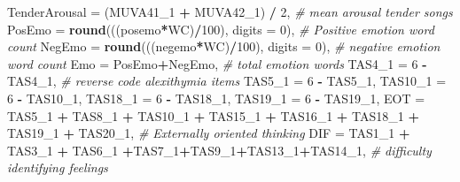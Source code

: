 \documentclass[]{article}
\newenvironment{Shaded}{\begin{snugshade}}{\end{snugshade}}
\newcommand{\CommentTok}[1]{\textcolor[rgb]{0.56,0.35,0.01}{\textit{#1}}}
\newcommand{\DataTypeTok}[1]{\textcolor[rgb]{0.13,0.29,0.53}{#1}}
\newcommand{\DecValTok}[1]{\textcolor[rgb]{0.00,0.00,0.81}{#1}}
\newcommand{\KeywordTok}[1]{\textcolor[rgb]{0.13,0.29,0.53}{\textbf{#1}}}
\newcommand{\NormalTok}[1]{#1}
\newcommand{\OperatorTok}[1]{\textcolor[rgb]{0.81,0.36,0.00}{\textbf{#1}}}
\newcommand{\StringTok}[1]{\textcolor[rgb]{0.31,0.60,0.02}{#1}}
\begin{document}
\begin{Shaded}
\begin{Highlighting}[]
{                          \DataTypeTok{TenderArousal =}\NormalTok{ (MUVA41_}\DecValTok{1} \OperatorTok{+}\StringTok{ }\NormalTok{MUVA42_}\DecValTok{1}\NormalTok{) }\OperatorTok{/}\StringTok{ }\DecValTok{2}\NormalTok{, }\CommentTok{# mean arousal tender songs}
                          \DataTypeTok{PosEmo =} \KeywordTok{round}\NormalTok{(((posemo}\OperatorTok{*}\NormalTok{WC)}\OperatorTok{/}\DecValTok{100}\NormalTok{), }\DataTypeTok{digits =} \DecValTok{0}\NormalTok{), }\CommentTok{# Positive emotion word count}
                          \DataTypeTok{NegEmo =} \KeywordTok{round}\NormalTok{(((negemo}\OperatorTok{*}\NormalTok{WC)}\OperatorTok{/}\DecValTok{100}\NormalTok{), }\DataTypeTok{digits =} \DecValTok{0}\NormalTok{), }\CommentTok{# negative emotion word count}
                          \DataTypeTok{Emo =}\NormalTok{ PosEmo}\OperatorTok{+}\NormalTok{NegEmo, }\CommentTok{# total emotion words}
                          \DataTypeTok{TAS4_1 =} \DecValTok{6} \OperatorTok{-}\StringTok{ }\NormalTok{TAS4_}\DecValTok{1}\NormalTok{, }\CommentTok{# reverse code alexithymia items}
                          \DataTypeTok{TAS5_1 =} \DecValTok{6} \OperatorTok{-}\StringTok{ }\NormalTok{TAS5_}\DecValTok{1}\NormalTok{,}
                          \DataTypeTok{TAS10_1 =} \DecValTok{6} \OperatorTok{-}\StringTok{ }\NormalTok{TAS10_}\DecValTok{1}\NormalTok{,}
                          \DataTypeTok{TAS18_1 =} \DecValTok{6} \OperatorTok{-}\StringTok{ }\NormalTok{TAS18_}\DecValTok{1}\NormalTok{,}
                          \DataTypeTok{TAS19_1 =} \DecValTok{6} \OperatorTok{-}\StringTok{ }\NormalTok{TAS19_}\DecValTok{1}\NormalTok{,}
                          \DataTypeTok{EOT =}\NormalTok{ TAS5_}\DecValTok{1} \OperatorTok{+}\StringTok{ }\NormalTok{TAS8_}\DecValTok{1} \OperatorTok{+}\StringTok{ }\NormalTok{TAS10_}\DecValTok{1} \OperatorTok{+}\StringTok{ }\NormalTok{TAS15_}\DecValTok{1} \OperatorTok{+}\StringTok{ }\NormalTok{TAS16_}\DecValTok{1} \OperatorTok{+}\StringTok{ }\NormalTok{TAS18_}\DecValTok{1} \OperatorTok{+}\StringTok{ }\NormalTok{TAS19_}\DecValTok{1} \OperatorTok{+}\StringTok{ }\NormalTok{TAS20_}\DecValTok{1}\NormalTok{, }\CommentTok{# Externally oriented thinking}
                          \DataTypeTok{DIF =}\NormalTok{ TAS1_}\DecValTok{1} \OperatorTok{+}\StringTok{ }\NormalTok{TAS3_}\DecValTok{1} \OperatorTok{+}\StringTok{ }\NormalTok{TAS6_}\DecValTok{1} \OperatorTok{+}\NormalTok{TAS7_}\DecValTok{1}\OperatorTok{+}\NormalTok{TAS9_}\DecValTok{1}\OperatorTok{+}\NormalTok{TAS13_}\DecValTok{1}\OperatorTok{+}\NormalTok{TAS14_}\DecValTok{1}\NormalTok{, }\CommentTok{# difficulty identifying feelings}
}
\end{Highlighting}
\end{Shaded}
\end{document}

